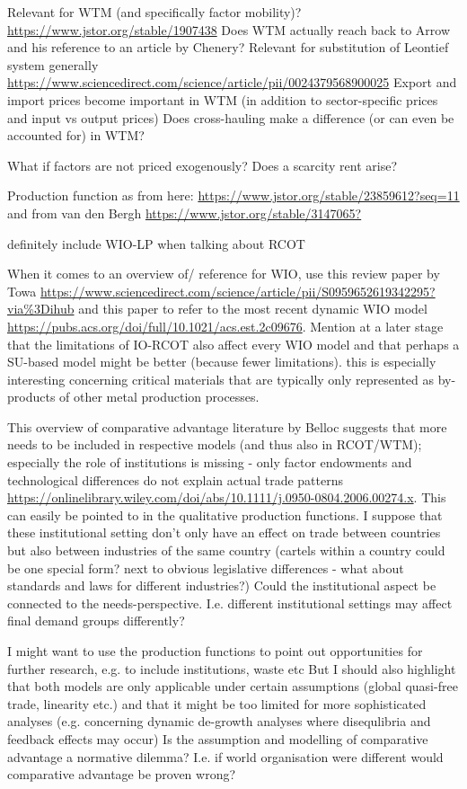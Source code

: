 Relevant for WTM (and specifically factor mobility)? \url{https://www.jstor.org/stable/1907438} Does WTM actually reach back to Arrow and his reference to an article by Chenery?
Relevant for substitution of Leontief system generally \url{https://www.sciencedirect.com/science/article/pii/0024379568900025}
Export and import prices become important in WTM (in addition to sector-specific prices and input vs output prices)
Does cross-hauling make a difference (or can even be accounted for) in WTM?

What if factors are not priced exogenously? Does a scarcity rent arise?

Production function as from here: \url{https://www.jstor.org/stable/23859612?seq=11} and from van den Bergh \url{https://www.jstor.org/stable/3147065?}

definitely include WIO-LP when talking about RCOT

When it comes to an overview of/ reference for WIO, use this review paper by Towa \url{https://www.sciencedirect.com/science/article/pii/S0959652619342295?via%3Dihub} and this paper to refer to the most recent dynamic WIO model \url{https://pubs.acs.org/doi/full/10.1021/acs.est.2c09676}. Mention at a later stage that the limitations of IO-RCOT also affect every WIO model and that perhaps a SU-based model might be better (because fewer limitations). this is especially interesting concerning critical materials that are typically only represented as by-products of other metal production processes.

This overview of comparative advantage literature by Belloc suggests that more needs to be included in respective models (and thus also in RCOT/WTM); especially the role of institutions is missing - only factor endowments and technological differences do not explain actual trade patterns \url{https://onlinelibrary.wiley.com/doi/abs/10.1111/j.0950-0804.2006.00274.x}. This can easily be pointed to in the qualitative production functions.
I suppose that these institutional setting don't only have an effect on trade between countries but also between industries of the same country (cartels within a country could be one special form? next to obvious legislative differences - what about standards and laws for different industries?)
Could the institutional aspect be connected to the needs-perspective. I.e. different institutional settings may affect final demand groups differently?

I might want to use the production functions to point out opportunities for further research, e.g. to include institutions, waste etc
But I should also highlight that both models are only applicable under certain assumptions (global quasi-free trade, linearity etc.) and that it might be too limited for more sophisticated analyses (e.g. concerning dynamic de-growth analyses where disequlibria and feedback effects may occur)
Is the assumption and modelling of comparative advantage a normative dilemma? I.e. if world organisation were different would comparative advantage be proven wrong?

